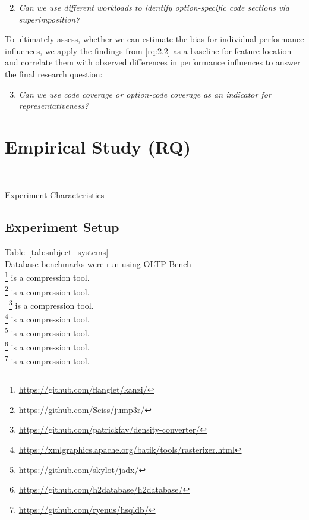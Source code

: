 \begin{enumerate}[align=left,label=RQ2.\arabic*]
	\setcounter{enumi}{1}
	\item\textit{Can we use different workloads to identify option-specific code sections via superimposition?}\label{rq:2.2}
\end{enumerate}

To ultimately assess, whether we can estimate the bias for individual performance influences, we apply the findings from \ref{rq:2.2} as a baseline for feature location and correlate them with observed differences in performance influences to answer the final research question:

\begin{enumerate}[align=left,label=RQ2.\arabic*]
	\setcounter{enumi}{2}
	\item\textit{Can we use code coverage or option-code coverage as an indicator for representativeness?}\label{rq:2.3}
\end{enumerate}


\section{Empirical Study (RQ)}~\label{sec:study}

\begin{table*}[ht!]
	\centering
	\caption{Experiment Characteristics}
	
	\label{tab:subject_systems}
\end{table*}


\subsection{Experiment Setup}
Table~\ref{tab:subject_systems}\\
Database benchmarks were run using OLTP-Bench\cite{difallah_oltp_2013}\\
\noindent{}\footnote{\url{https://github.com/flanglet/kanzi/}} is a compression tool.\\
\footnote{\url{https://github.com/Sciss/jump3r/}} is a compression tool.\\\
\footnote{\url{https://github.com/patrickfav/density-converter/}} is a compression tool.\\
\sosy{batik}\footnote{\url{https://xmlgraphics.apache.org/batik/tools/rasterizer.html}} is a compression tool.\\
\sosy{jadx}\footnote{\url{https://github.com/skylot/jadx/}} is a compression tool.\\
\sosy{h2}\footnote{\url{https://github.com/h2database/h2database/}} is a compression tool.\\
\sosy{hsqldb}\footnote{\url{https://github.com/ryenus/hsqldb/}} is a compression tool.\\
